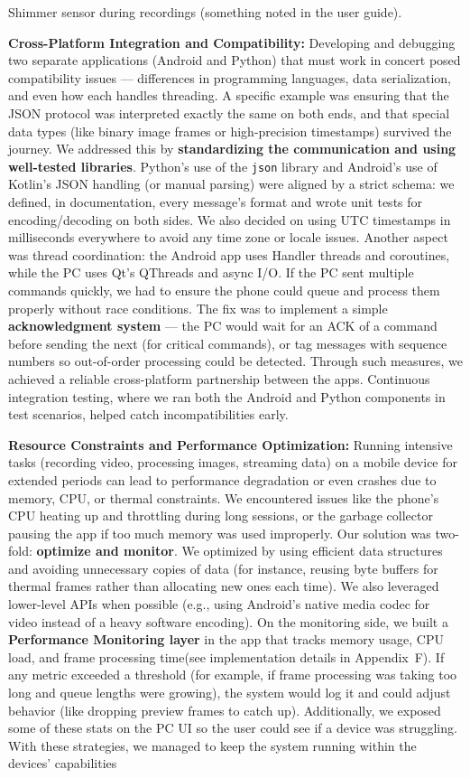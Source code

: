 Shimmer sensor during recordings (something noted in the user guide). \item \textbf{Cross-Platform Integration and Compatibility:} Developing and debugging two separate applications (Android and Python) that must work in concert posed compatibility issues --- differences in programming languages, data serialization, and even how each handles threading. A specific example was ensuring that the JSON protocol was interpreted exactly the same on both ends, and that special data types (like binary image frames or high-precision timestamps) survived the journey. We addressed this by \textbf{standardizing the communication and using well-tested libraries}. Python's use of the \texttt{json} library and Android's use of Kotlin's JSON handling (or manual parsing) were aligned by a strict schema: we defined, in documentation, every message's format and wrote unit tests for encoding/decoding on both sides. We also decided on using UTC timestamps in milliseconds everywhere to avoid any time zone or locale issues. Another aspect was thread coordination: the Android app uses Handler threads and coroutines, while the PC uses Qt's QThreads and async I/O. If the PC sent multiple commands quickly, we had to ensure the phone could queue and process them properly without race conditions. The fix was to implement a simple \textbf{acknowledgment system} --- the PC would wait for an ACK of a command before sending the next (for critical commands), or tag messages with sequence numbers so out-of-order processing could be detected. Through such measures, we achieved a reliable cross-platform partnership between the apps. Continuous integration testing, where we ran both the Android and Python components in test scenarios, helped catch incompatibilities early. \item \textbf{Resource Constraints and Performance Optimization:} Running intensive tasks (recording video, processing images, streaming data) on a mobile device for extended periods can lead to performance degradation or even crashes due to memory, CPU, or thermal constraints. We encountered issues like the phone's CPU heating up and throttling during long sessions, or the garbage collector pausing the app if too much memory was used improperly. Our solution was two-fold: \textbf{optimize and monitor}. We optimized by using efficient data structures and avoiding unnecessary copies of data (for instance, reusing byte buffers for thermal frames rather than allocating new ones each time). We also leveraged lower-level APIs when possible (e.g., using Android's native media codec for video instead of a heavy software encoding). On the monitoring side, we built a \textbf{Performance Monitoring layer} in the app that tracks memory usage, CPU load, and frame processing time(see implementation details in Appendix~F). If any metric exceeded a threshold (for example, if frame processing was taking too long and queue lengths were growing), the system would log it and could adjust behavior (like dropping preview frames to catch up). Additionally, we exposed some of these stats on the PC UI so the user could see if a device was struggling. With these strategies, we managed to keep the system running within the devices' capabilities 